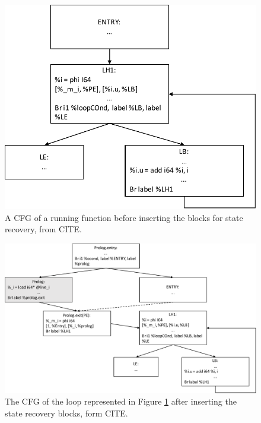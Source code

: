 \begin{figure}[h]
\centering
\includegraphics[scale=0.5]{Figures/FCFG}
\decoRule
\caption[A CFG of a running function before inserting the blocks for state recovery]{A CFG of a running function before inserting the blocks for state recovery, from CITE.}
\label{FCFG}
\end{figure}

\begin{figure}[h]
\centering
\includegraphics[scale=0.5]{Figures/FOptCFG}
\decoRule
\caption[The CFG of the loop represented in Figure \ref{FCFG} after inserting the state recovery blocks, form CITE.]{The CFG of the loop represented in Figure \ref{FCFG} after inserting the state recovery blocks, form CITE.}
\label{InstFCFG}
\end{figure}\\

